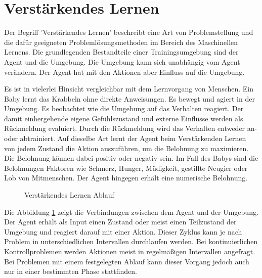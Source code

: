{\section{Verstärkendes Lernen}}
\label{sec:rl}
Der Begriff 'Verstärkendes Lernen' beschreibt eine Art von Problemstellung und die dafür geeigneten Problemlösungsmethoden im Bereich des Maschinellen Lernens. Die grundlegenden Bestandteile einer Trainingsumgebung sind der Agent und die Umgebung. Die Umgebung kann sich unabhängig vom Agent verändern. Der Agent hat mit den Aktionen aber Einfluss auf die Umgebung. 

Es ist in vielerlei Hinsicht vergleichbar mit dem Lernvorgang von Menschen. Ein Baby lernt das Krabbeln ohne direkte Anweisungen. Es bewegt und agiert in der Umgebung. Es beobachtet wie die Umgebung auf das Verhalten reagiert. Der damit einhergehende eigene Gefühlszustand und externe Einflüsse werden als Rückmeldung evaluiert. Durch die Rückmeldung wird das Verhalten entweder an- oder abtrainiert. Auf dieselbe Art lernt der Agent beim Verstärkenden Lernen von jedem Zustand die Aktion auszuführen, um die Belohnung zu maximieren. Die Belohnung können dabei positiv oder negativ sein. Im Fall des Babys sind die Belohnungen Faktoren wie Schmerz, Hunger, Müdigkeit, gestillte Neugier oder Lob von Mitmenschen. Der Agent hingegen erhält eine numerische Belohnung.\cite{sutton2018reinforcement}

\begin{figure}[H]
  \centering
  \caption{Verstärkendes Lernen Ablauf}
  \label{fig:vl_ablauf}
\end{figure}

Die Abbildung \ref{fig:vl_ablauf} zeigt die Verbindungen zwischen dem Agent und der Umgebung. Der Agent erhält als Input einen Zustand oder meist einen Teilzustand der Umgebung und reagiert darauf mit einer Aktion. Dieser Zyklus kann je nach Problem in unterschiedlichen Intervallen durchlaufen werden. Bei kontinuierlichen Kontrollproblemen werden Aktionen meist in regelmäßigen Intervallen angefragt. Bei Problemen mit einem festgelegten Ablauf kann dieser Vorgang jedoch auch nur in einer bestimmten Phase stattfinden.

\newpage